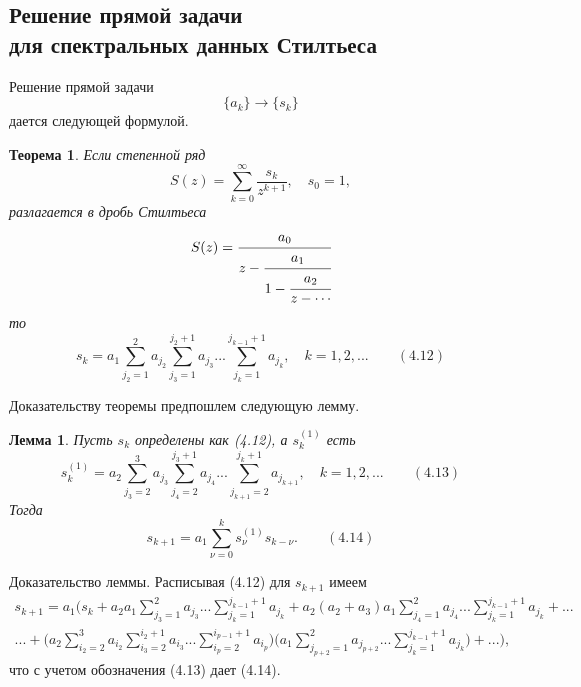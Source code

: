 \documentclass[12pt,a4paper]{article}
\theoremstyle{plain}   \newtheorem{Pro}{Задача}
\newtheorem{The}{Теорема}
\newtheorem{Lem}{Лемма}
\begin{document}
\subsection{Решение прямой задачи \\
для спектральных данных
Стилтьеса}
Решение прямой задачи
$$
  \{ a_k \} \longrightarrow \{ s_k \}
$$
дается следующей формулой.
\begin{The}
Если степенной ряд
$$
  S(z)=\sum _{k=0}^{\infty}
    \frac{s_k}{z^{k+1}}, \quad s_0 =1,
$$
разлагается в дробь Стилтьеса
\begin{equation*}
  S(z)=
    \cfrac{a_0}{z-
	  \cfrac{a_1}{1-
	    \cfrac{a_2}{z-\dotsb
	}}}
\end{equation*}
то
\begin{equation*}
  s_k =a_1 \sum _{j_2 =1}^2 a_{j_2}
    \sum _{j_3 =1}^{j_2 +1}a_{j_3}...
	  \sum _{j_k =1}^{j_{k-1}+1}a_{j_k},
	    \quad k=1,2,... \qquad (4.12)
\end{equation*}
\end{The}
Доказательству теоремы предпошлем следующую лемму.
\begin{Lem}
Пусть
$ s_k $
определены как (4.12), а
$ s_k ^{(1)} $
есть
\begin{equation*}
  s_k ^{(1)}=a_2 \sum _{j_3 =2}^3 a_{j_3}
    \sum _{j_4 =2}^{j_3 +1}a_{j_4}...
	  \sum _{j_{k+1}=2}^{j_k +1}a_{j_{k+1}},
	    \quad k=1,2,... \qquad (4.13)
\end{equation*}
Тогда
\begin{equation*}
  s_{k+1}=a_1 \sum _{\nu =0}^k s_{\nu}^{(1)}s_{k-\nu}.
  \qquad (4.14)
\end{equation*}
\end{Lem}
{\Large Доказательство леммы.}
Расписывая (4.12) для
$ s_{k+1} $
имеем
\begin{multline*}
  s_{k+1}=a_1 \Biggl (
    s_k +a_2 a_1
	  \sum _{j_3 =1}^2 a_{j_3}...
	    \sum _{j_k =1}^{j_{k-1}+1}a_{j_k}+
		  a_2 (a_2 +a_3 )a_1
		    \sum _{j_4 =1}^2 a_{j_4}...
			  \sum _{j_k =1}^{j_{k-1}+1}a_{j_k}+...\\
   ...+ \biggl ( a_2
     \sum _{i_2 =2}^3 a_{i_2}
	   \sum _{i_3 =2}^{i_2 +1}a_{i_3}...
	     \sum _{i_p =2}^{i_{p-1}+1}a_{i_p} \biggr )
		   \biggl ( a_1
		     \sum _{j_{p+2}=1}^2 a_{j_{p+2}}...
			   \sum _{j_k =1}^{j_{k-1}+1}a_{j_k} \biggr )+
			   ... \Biggr ),
\end{multline*}
что с учетом обозначения (4.13) дает (4.14).\\
\end{document}
